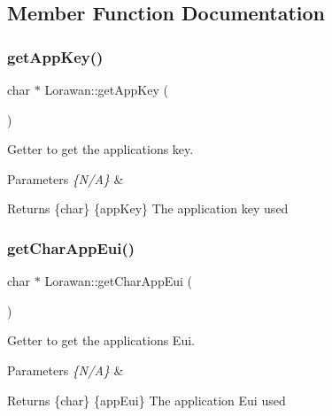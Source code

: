 \subsection{Member Function Documentation}
\mbox{\label{class_lorawan_a2a95dfcf1dc5868cd6e8a5fb8c4e5231}} 
\subsubsection{\texorpdfstring{get\+App\+Key()}{getAppKey()}}
{\footnotesize\ttfamily char $\ast$ Lorawan\+::get\+App\+Key (\begin{DoxyParamCaption}{ }\end{DoxyParamCaption})}

Getter to get the application\textquotesingle{}s key. 
\begin{DoxyParams}{Parameters}
{\em \{\+N/\+A\}} & \\
\hline
\end{DoxyParams}
\begin{DoxyReturn}{Returns}
\{char\} \{app\+Key\} The application key used 
\end{DoxyReturn}
\mbox{\label{class_lorawan_a2d454c9a1216a5ae80c3c20c6a3b5e32}} 
\subsubsection{\texorpdfstring{get\+Char\+App\+Eui()}{getCharAppEui()}}
{\footnotesize\ttfamily char $\ast$ Lorawan\+::get\+Char\+App\+Eui (\begin{DoxyParamCaption}{ }\end{DoxyParamCaption})}

Getter to get the application\textquotesingle{}s Eui. 
\begin{DoxyParams}{Parameters}
{\em \{\+N/\+A\}} & \\
\hline
\end{DoxyParams}
\begin{DoxyReturn}{Returns}
\{char\} \{app\+Eui\} The application Eui used 
\end{DoxyReturn}
\mbox{\label{class_lorawan_ab24ea4c1ed2f9fdc6f64d9c0fe64ca60}} 
